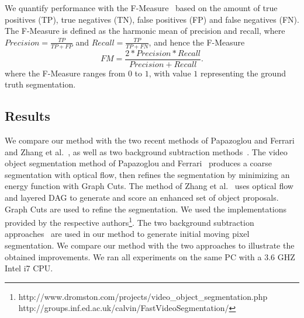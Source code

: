 
We quantify performance with the F-Measure~\cite{sobral2014} based on the amount of true positives (TP), true negatives (TN), false positives (FP) and false negatives (FN). The F-Measure is defined as the harmonic mean of precision and recall, where $Precision = \frac{TP}{TP+FP}$ and $Recall = \frac{TP}{TP+FN}$, and hence the F-Measure
\begin{equation}
\label{equ-fm}
FM = \frac{2*Precision*Recall}{Precision+Recall}.
\end{equation}
where the F-Measure ranges from $0$ to $1$, with value $1$ representing the ground truth segmentation.


\subsection{Results}
\label{os-results}

We compare our method with the two recent methods of Papazoglou and Ferrari~\cite{papazoglou2013} and Zhang et al.~\cite{zhang2013}, as well as two background subtraction methods~\cite{kaewtrakulpong2002,zivkovic2004}.
The video object segmentation method of Papazoglou and Ferrari~\cite{papazoglou2013} produces a coarse segmentation with optical flow, then refines the segmentation by minimizing an energy function with Graph Cuts.
The method of Zhang et al.~\cite{zhang2013} uses optical flow and layered DAG to generate and score an enhanced set of object proposals. Graph Cuts are used to refine the segmentation.
We used the implementations provided by the respective authors\footnote{http://www.dromston.com/projects/video\_object\_segmentation.php\\http://groups.inf.ed.ac.uk/calvin/FastVideoSegmentation/}.
The two background subtraction approaches~\cite{kaewtrakulpong2002,zivkovic2004} are used in our method to generate initial moving pixel segmentation. We compare our method with the two approaches to illustrate the obtained improvements.
We ran all experiments on the same PC with a 3.6 GHZ Intel i7 CPU.

